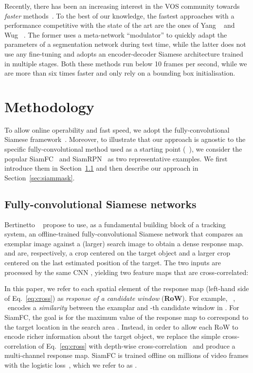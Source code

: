 \documentclass[10pt,twocolumn,letterpaper]{article}
\newcommand{\mypar}[1]{\smallskip\noindent {\bf #1}\enskip}
\begin{document}
Recently, there has been an increasing interest in the VOS community towards \emph{faster} methods~\cite{marki2016bilateral,wug2018fast,cheng2018fast,chen2018blazingly,jampani2017video,hu2018videomatch}.
To the best of our knowledge, the fastest approaches with a performance competitive with the state of the art are the ones of Yang \etal~\cite{Yang_2018_CVPR} and Wug \etal~\cite{wug2018fast}.
The former uses a meta-network ``modulator'' to quickly adapt the parameters of a segmentation network during test time, while the latter does not use any fine-tuning and adopts an encoder-decoder Siamese architecture trained in multiple stages.
Both these methods run below 10 frames per second, while we are more than six times faster and only rely on a bounding box initialisation.
 
\section{Methodology}
\label{sec:method}
To allow online operability and fast speed, we adopt the fully-convolutional Siamese framework~\cite{bertinetto2016fully}.
Moreover, to illustrate that our approach is agnostic to the specific fully-convolutional method used as a starting point (\eg~\cite{bertinetto2016fully,SiamRPN,zhu2018distractor,yang2018learning,he2018twofold}), we consider the popular SiamFC~\cite{bertinetto2016fully} and SiamRPN~\cite{SiamRPN} as two representative examples.
We first introduce them in Section~\ref{sec:fc} and then describe our approach in Section~\ref{sec:siammask}.

\subsection{Fully-convolutional Siamese networks}
\label{sec:fc}
\mypar{SiamFC.}
Bertinetto \etal~\cite{bertinetto2016fully} propose to use, as a fundamental building block of a tracking system, an offline-trained fully-convolutional Siamese network that compares an exemplar image  against a (larger) search image  to obtain a dense response map.
 and  are, respectively, a  crop centered on the target object  and a larger crop centered on the last estimated position of the target.
The two inputs are processed by the same CNN , yielding two feature maps that are cross-correlated:

In this paper, we refer to each spatial element of the response map (left-hand side of Eq.~\ref{eq:cross}) as \emph{response of a candidate window} (\textbf{RoW}).
For example, ~, ~encodes a \textit{similarity} between the examplar  and -th candidate window in .
For SiamFC, the goal is for the maximum value of the response map to correspond to the target location in the search area .
Instead, in order to allow each RoW to encode richer information about the target object, we replace the simple cross-correlation of Eq.~\ref{eq:cross} with depth-wise cross-correlation~\cite{bertinetto2016learning} and produce a multi-channel response map.
SiamFC is trained offline on millions of video frames with the logistic loss~\cite[Section 2.2]{bertinetto2016fully}, which we refer to as .
\end{document}
